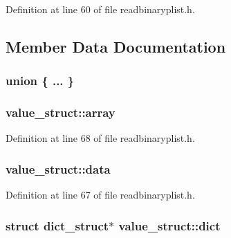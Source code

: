 Definition at line 60 of file readbinaryplist.\+h.



\subsection{Member Data Documentation}
\subsubsection[{\texorpdfstring{"@221}{@221}}]{\setlength{\rightskip}{0pt plus 5cm}union \{ ... \} }\hypertarget{structvalue__struct_a577631208232bacdcfb592ca2b7167d8}{}\label{structvalue__struct_a577631208232bacdcfb592ca2b7167d8}
\subsubsection[{\texorpdfstring{array}{array}}]{ value\+\_\+struct\+::array}\hypertarget{structvalue__struct_a08902e61880b9638a37f9b180face471}{}\label{structvalue__struct_a08902e61880b9638a37f9b180face471}


Definition at line 68 of file readbinaryplist.\+h.

\subsubsection[{\texorpdfstring{data}{data}}]{ value\+\_\+struct\+::data}\hypertarget{structvalue__struct_a9e6e57b12fdf03e97f4c552d700f5dc2}{}\label{structvalue__struct_a9e6e57b12fdf03e97f4c552d700f5dc2}


Definition at line 67 of file readbinaryplist.\+h.

\subsubsection[{\texorpdfstring{dict}{dict}}]{\setlength{\rightskip}{0pt plus 5cm}struct {\bf dict\+\_\+struct}$\ast$ value\+\_\+struct\+::dict}\hypertarget{structvalue__struct_a86b769cd843831a6abb549dba57d5004}{}\label{structvalue__struct_a86b769cd843831a6abb549dba57d5004}


